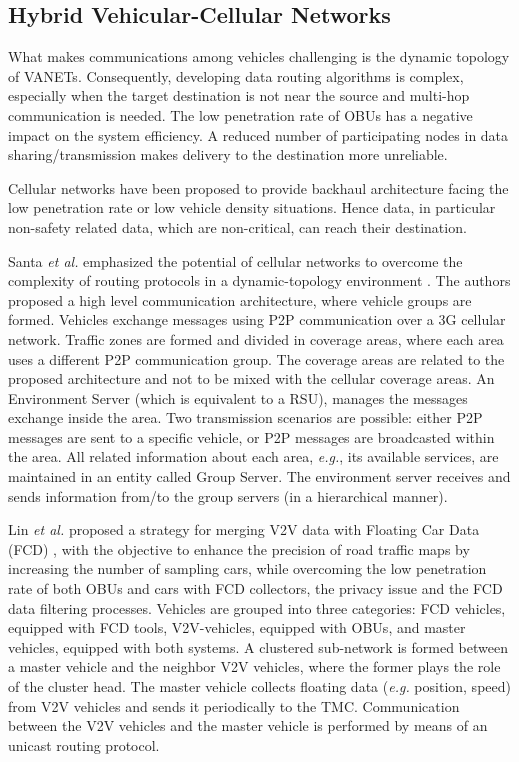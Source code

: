 \documentclass[10pt,onecolumn]{article}
\begin{document}
 \subsection{Hybrid Vehicular-Cellular Networks}

What makes communications among vehicles challenging is the dynamic topology of VANETs. Consequently, developing data routing algorithms is complex, especially when the target destination is not near the source and multi-hop communication is needed. The low penetration rate of OBUs has a negative impact on the system efficiency. A reduced number of participating nodes in data sharing/transmission makes delivery to the destination more unreliable. 

Cellular networks have been proposed to provide backhaul architecture facing the low penetration rate or low vehicle density situations. Hence data, in particular non-safety related data, which are non-critical, can reach their destination. 

Santa \textit{et al.} emphasized the potential of cellular networks to overcome the complexity of routing protocols in a dynamic-topology environment \cite{vanet.cell01} \cite{vanet.cell02}.
The authors proposed a high level communication architecture, where vehicle groups are formed. Vehicles exchange messages using P2P communication over a 3G cellular network.
Traffic zones are formed and divided in coverage areas, where each area uses a different P2P communication group. The coverage areas are related to the proposed architecture and not to be mixed with the cellular coverage areas.
An Environment Server (which is equivalent to a RSU), manages the messages exchange inside the area. Two transmission scenarios are possible: either P2P messages are sent to a specific vehicle, or P2P messages are broadcasted within the area.
All related information about each area, \textit{e.g.}, its available services, are maintained in an entity called Group Server. The environment server receives and sends information from/to the group servers (in a hierarchical manner).

Lin \textit{et al.} proposed a strategy for merging V2V data with Floating Car Data (FCD) \cite{Lin2006}, with the objective to enhance the precision of road traffic maps by increasing the number of sampling cars, while overcoming the low penetration rate of both OBUs and cars with FCD collectors, the privacy issue and the FCD data filtering processes.
Vehicles are grouped into three categories: FCD vehicles, equipped with FCD tools, V2V-vehicles, equipped with OBUs, and master vehicles, equipped with both systems. A clustered sub-network is formed between a master vehicle and the neighbor V2V vehicles, where the former plays the role of the cluster head. The master vehicle collects floating data (\textit{e.g.} position, speed) from V2V vehicles and sends it periodically to the TMC.
Communication between the V2V vehicles and the master vehicle is performed by means of an unicast routing protocol.
\end{document}
